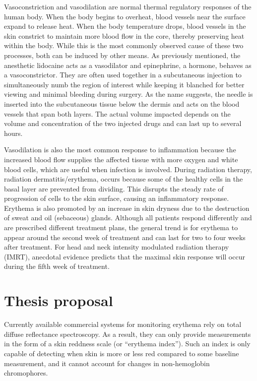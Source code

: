 Vasoconstriction and vasodilation are normal thermal regulatory responses of the human body.\cite{Kellogg2012} When the body begins to overheat, blood vessels near the surface expand to release heat. When the body temperature drops, blood vessels in the skin constrict to maintain more blood flow in the core, thereby preserving heat within the body. While this is the most commonly observed cause of these two processes, both can be induced by other means. As previously mentioned, the anesthetic lidocaine acts as a vasodilator and epinephrine, a hormone, behaves as a vasoconstrictor. They are often used together in a subcutaneous injection to simultaneously numb the region of interest while keeping it blanched for better viewing and minimal bleeding during surgery. As the name suggests, the needle is inserted into the subcutaneous tissue below the dermis and acts on the blood vessels that span both layers. The actual volume impacted depends on the volume and concentration of the two injected drugs and can last up to several hours.

Vasodilation is also the most common response to inflammation because the increased blood flow supplies the affected tissue with more oxygen and white blood cells, which are useful when infection is involved. During radiation therapy, radiation dermatitis/erythema, occurs because some of the healthy cells in the basal layer are prevented from dividing.\cite{Fitzgerald2008} This disrupts the steady rate of progression of cells to the skin surface, causing an inflammatory response. Erythema is also promoted by an increase in skin dryness due to the destruction of sweat and oil (sebaceous) glands. Although all patients respond differently and are prescribed different treatment plans, the general trend is for erythema to appear around the second week of treatment and can last for two to four weeks after treatment. For head and neck intensity modulated radiation therapy (IMRT), anecdotal evidence predicts that the maximal skin response will occur during the fifth week of treatment.

\section{Thesis proposal}
Currently available commercial systems for monitoring erythema rely on total diffuse reflectance spectroscopy. As a result, they can only provide measurements in the form of a skin reddness scale (or ``erythema index''). Such an index is only capable of detecting when skin is more or less red compared to some baseline measurement, and it cannot account for changes in non-hemoglobin chromophores.

